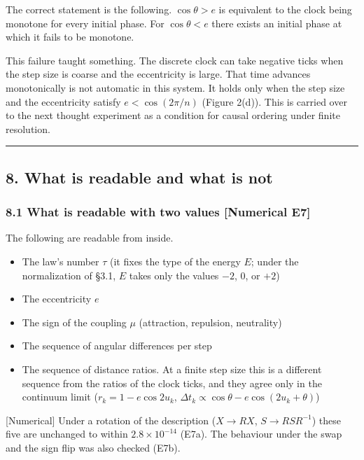 \documentclass[
  a4paper,
]{article}
\providecommand{\tightlist}{%
  \setlength{\itemsep}{0pt}\setlength{\parskip}{0pt}}
\begin{document}
The correct statement is the following. \(\cos\theta>e\) is equivalent
to the clock being monotone for every initial phase. For
\(\cos\theta<e\) there exists an initial phase at which it fails to be
monotone.

This failure taught something. The discrete clock can take negative
ticks when the step size is coarse and the eccentricity is large. That
time advances monotonically is not automatic in this system. It holds
only when the step size and the eccentricity satisfy \(e<\cos(2\pi/n)\)
(Figure 2(d)). This is carried over to the next thought experiment as a
condition for causal ordering under finite resolution.

\begin{center}\rule{0.5\linewidth}{0.5pt}\end{center}

\subsection{8. What is readable and what is
not}\label{what-is-readable-and-what-is-not}

\subsubsection{8.1 What is readable with two values {[}Numerical
E7{]}}\label{what-is-readable-with-two-values-numerical-e7}

The following are readable from inside.

\begin{itemize}
\tightlist
\item
  The law's number \(\tau\) (it fixes the type of the energy \(E\);
  under the normalization of §3.1, \(E\) takes only the values \(-2\),
  \(0\), or \(+2\))
\item
  The eccentricity \(e\)
\item
  The sign of the coupling \(\mu\) (attraction, repulsion, neutrality)
\item
  The sequence of angular differences per step
\item
  The sequence of distance ratios. At a finite step size this is a
  different sequence from the ratios of the clock ticks, and they agree
  only in the continuum limit (\(r_k=1-e\cos2u_k\),
  \(\Delta t_k\propto\cos\theta-e\cos(2u_k+\theta)\))
\end{itemize}

{[}Numerical{]} Under a rotation of the description (\(X\to RX\),
\(S\to RSR^{-1}\)) these five are unchanged to within
\(2.8\times10^{-14}\) (E7a). The behaviour under the swap and the sign
flip was also checked (E7b).
\end{document}
